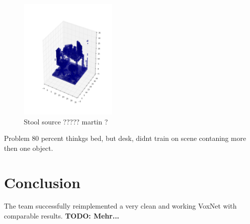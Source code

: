\documentclass[10pt,twocolumn,letterpaper]{article}
\begin{document}
\begin{figure}[h]
	\label{fig:voxel_desk}
	\centering
	\includegraphics[width=0.42\textwidth]{figures/tango_voxel_desk_scene}
	\caption{Stool source ????? martin ?}
\end{figure}

Problem 80 percent thinkgs bed, but desk, didnt train on scene contaning more then one object.



\section{Conclusion}

The team successfully reimplemented a very clean and working VoxNet with comparable results.
\textbf{TODO: Mehr...}

{\small


}
\end{document}
